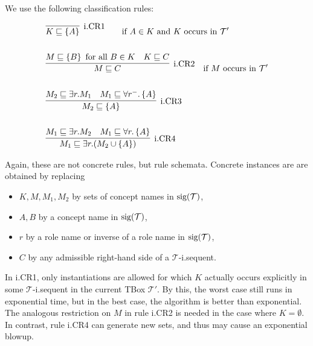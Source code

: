 We use the following classification rules:
\begin{mdframed}[frametitle=Classification rules for $\mathcal{ELI}$]
	\begin{align*}
		&\infer[\text{i.CR1}]{ K \sqsubseteq \left\{ A \right\}}{}\qquad\text{if $A \in K$ and $K$ occurs in $\mathcal{T}'$}\\\\
		&\infer[\text{i.CR2}]{M \sqsubseteq C}{M \sqsubseteq \left\{ B \right\} \text{ for all } B \in K & K \sqsubseteq C}\quad\text{if $M$ occurs in $\mathcal{T}'$}\\\\
		&\infer[\text{i.CR3}]{M_2 \sqsubseteq \left\{ A \right\}}{M_2 \sqsubseteq \exists r.M_1 & M_1 \sqsubseteq \forall r^-.\left\{ A \right\}}\\\\
		&\infer[\text{i.CR4}]{M_1 \sqsubseteq \exists r.(M_2 \cup \left\{ A \right\})}{M_1 \sqsubseteq \exists r.M_2 & M_1 \sqsubseteq \forall r.\left\{ A \right\}}
	\end{align*}
\end{mdframed}
\begin{note}
	Again, these are not concrete rules, but rule schemata.
	Concrete instances are are obtained by replacing
	\begin{itemize}
		\item $K, M, M_1, M_2$ by sets of concept names in $\operatorname{\text{sig}}(\mathcal{T})$,
		\item $A, B$ by a concept name in $\operatorname{\text{sig}}(\mathcal{T})$,
		\item $r$ by a role name or inverse of a role name in $\operatorname{\text{sig}}(\mathcal{T})$,
		\item $C$ by any admissible right-hand side of a $\mathcal{T}$-i.sequent.
	\end{itemize}
\end{note}
\begin{note}
	In i.CR1, only instantiations are allowed for which $K$ actually occurs explicitly in some $\mathcal{T}$-i.sequent
	in the current TBox $\mathcal{T}'$.
	By this, the worst case still runs in exponential time, but in the best case, the algorithm is better than exponential.
	The analogous restriction on $M$ in rule i.CR2 is needed in the case where $K = \emptyset$.
	In contrast, rule i.CR4 can generate new sets, and thus may cause an exponential blowup.
\end{note}
